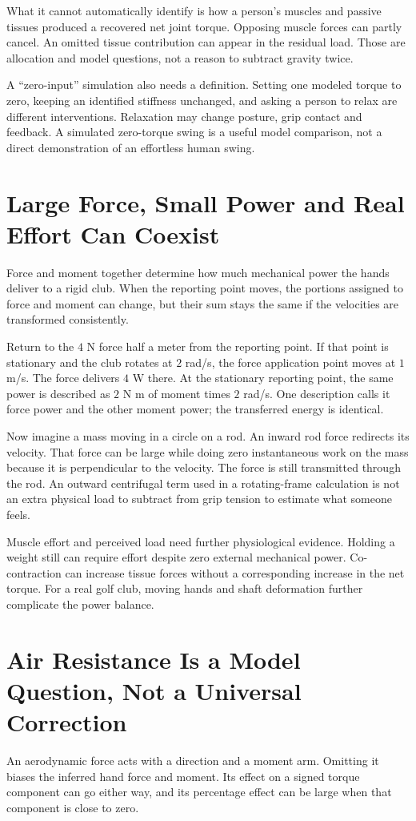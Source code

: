 \documentclass[11pt,a4paper]{article}
\begin{document}
What it cannot automatically identify is how a person's muscles and passive tissues produced a recovered net joint torque. Opposing muscle forces can partly cancel. An omitted tissue contribution can appear in the residual load. Those are allocation and model questions, not a reason to subtract gravity twice.

A ``zero-input'' simulation also needs a definition. Setting one modeled torque to zero, keeping an identified stiffness unchanged, and asking a person to relax are different interventions. Relaxation may change posture, grip contact and feedback. A simulated zero-torque swing is a useful model comparison, not a direct demonstration of an effortless human swing.

\section{Large Force, Small Power and Real Effort Can Coexist}
Force and moment together determine how much mechanical power the hands deliver to a rigid club. When the reporting point moves, the portions assigned to force and moment can change, but their sum stays the same if the velocities are transformed consistently.

Return to the $4$ N force half a meter from the reporting point. If that point is stationary and the club rotates at $2$ rad/s, the force application point moves at $1$ m/s. The force delivers $4$ W there. At the stationary reporting point, the same power is described as $2$ N m of moment times $2$ rad/s. One description calls it force power and the other moment power; the transferred energy is identical.

Now imagine a mass moving in a circle on a rod. An inward rod force redirects its velocity. That force can be large while doing zero instantaneous work on the mass because it is perpendicular to the velocity. The force is still transmitted through the rod. An outward centrifugal term used in a rotating-frame calculation is not an extra physical load to subtract from grip tension to estimate what someone feels.

Muscle effort and perceived load need further physiological evidence. Holding a weight still can require effort despite zero external mechanical power. Co-contraction can increase tissue forces without a corresponding increase in the net torque. For a real golf club, moving hands and shaft deformation further complicate the power balance.

\section{Air Resistance Is a Model Question, Not a Universal Correction}
An aerodynamic force acts with a direction and a moment arm. Omitting it biases the inferred hand force and moment. Its effect on a signed torque component can go either way, and its percentage effect can be large when that component is close to zero.
\end{document}
